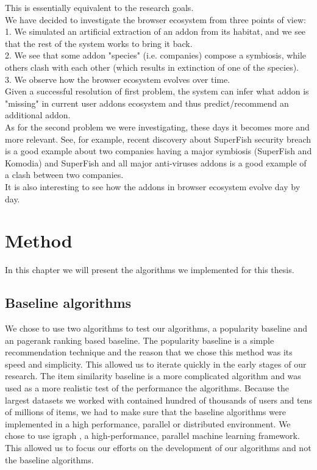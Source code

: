 \documentclass[11pt,oneside]{book}
\let\Oldsection\section
\renewcommand{\section}{\FloatBarrier\Oldsection}
\begin{document}
This is essentially equivalent to the research goals.\\
We have decided to investigate the browser ecosystem from three points of view:\\
1. We simulated an artificial extraction of an addon from its habitat, and we see that the rest of the system works to bring it back.\\
2. We see that some addon "species" (i.e. companies) compose a symbiosis, while others clash with each other (which results in extinction of one of the species).\\
3. We observe how the browser ecosystem evolves over time.\\
Given a successful resolution of first problem, the system can infer what addon is "missing" in current user addons ecosystem and thus predict/recommend an additional addon.\\
As for the second problem we were investigating, these days it becomes more and more relevant. See, for example, recent discovery about SuperFish security breach is a good example about two companies having a major symbiosis (SuperFish and Komodia) and SuperFish and all major anti-viruses addons is a good example of a clash between two companies.\\
It is also interesting to see how the addons in browser ecosystem evolve day by day.

\chapter{Method}
\label{sec:method}
In this chapter we will present the algorithms we implemented for this thesis.
\section{Baseline algorithms}
We chose to use two algorithms to test our algorithms, a popularity baseline and an pagerank ranking based baseline. The popularity baseline is a simple recommendation technique and the reason that we chose this method was its speed and simplicity. This allowed us to iterate quickly in the early stages of our research. The item similarity baseline is a more complicated algorithm and was used as a more realistic test of the performance the algorithms. Because the largest datasets we worked with contained hundred of thousands of users and tens of millions of items, we had to make sure that the
baseline algorithms were implemented in a high performance, parallel or distributed
environment. We chose to use igraph \citep{igraph}, a high-performance, parallel machine learning framework. This allowed us to focus our efforts on the development of our algorithms and not the baseline algorithms.
\end{document}
